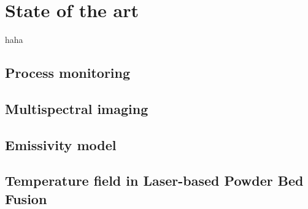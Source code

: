 \chapter{State of the art}%
haha\cite{Bammer.2010}
%
%
\section{Process monitoring}%

%
%
\section{Multispectral imaging}%

%
%
\section{Emissivity model}%

%
%
\section{Temperature field in Laser-based Powder Bed Fusion}